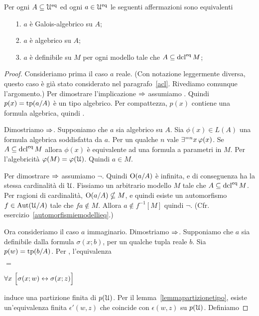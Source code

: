 \begin{theorem}\label{galois2} Per ogni $A\subseteq\EuScript U^{\rm eq}$ ed ogni $a\in\EuScript U^{\rm eq}$ le seguenti affermazioni sono equivalenti
\begin{itemize}
\item[1.] $a$ \`e Galois-algebrico su $A$;
\item[2.] $a$ \`e algebrico su $A$;
\item[3.] $a$ \`e definibile su $M$ per ogni modello tale che $A\subseteq \mathop{\rm dcl}^{\rm eq} M$;
\end{itemize}
\end{theorem}
\def\ceq#1#2#3{\parbox{20ex}{\hskip0pt #1}\llap{#2}\parbox{8ex}{\hfil #3}}
\begin{proof} 
Consideriamo prima il caso $a$ reale. (Con notazione leggermente diversa, questo caso \`e gi\`a stato considerato nel paragrafo~\ref{acl}. Rivediamo comunque l'argomento.) Per dimostrare l'implicazione $\Rightarrow$ assumiamo . Quindi $p(x)=\textrm{tp}(a/A)$ \`e un tipo algebrico. Per compattezza, $p(x)$ contiene una formula algebrica, quindi .

Dimostriamo $\Rightarrow$. Supponiamo che $a$ sia algebrico su $A$. Sia $\phi(x)\in L(A)$ una formula algebrica soddisfatta da $a$. Per un qualche $n$ vale $\exists^{=n}x\,\varphi(x)$. Se $A\subseteq \mathop{\rm dcl}^{\rm eq} M$ allora $\phi(x)$ \`e equivalente ad una formula a parametri in $M$. Per l'algebricit\`a $\varphi(M)=\varphi(\EuScript U)$. Quindi $a\in M$.

Per dimostrare $\Rightarrow$ assumiamo $\neg$. Quindi  $\textrm{O}(a/A)$ \`e infinita, e di conseguenza ha la stessa cardinalit\`a di $\EuScript U$. Fissiamo un arbitrario modello $M$ tale che $A\subseteq \mathop{\rm dcl}^{\rm eq} M$. Per ragioni di cardinalit\`a, $\textrm{O}(a/A)\nsubseteq M$, e quindi esiste un automorfismo $f\in\textrm{Aut}(\EuScript U/A)$ tale che $fa\notin M$. Allora $a\notin f^{-1}[M]$ quindi $\neg$. (Cfr. esercizio~\ref{automorfismiemodellieq}.) 

Ora consideriamo il caso $a$ immaginario. Dimostriamo $\Rightarrow$. Supponiamo che $a$ sia definibile dalla formula $\sigma(x;b)$, per un qualche tupla reale $b$. Sia $p(w)=\textrm{tp}(b/A)$. Per , l'equivalenza

\ceq{}{$\epsilon(w,z)$}{$=$}$\forall x\  \Big[\sigma(x;w)\leftrightarrow\sigma(x;z)\Big]$

induce una partizione finita di $p(\EuScript U)$. Per il lemma~\ref{lemmapartizionetipo}, esiste un'equivalenza finita $\epsilon'(w,z)$ che coincide con $\epsilon(w,z)$ su $p(\EuScript U)$. Definiamo


\end{proof}
